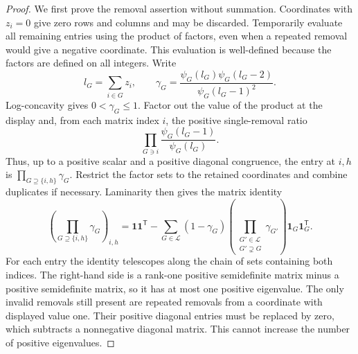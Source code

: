 \begin{proof}
We first prove the removal assertion without summation.
Coordinates with \(z_i=0\) give zero rows and columns and may be
discarded.
Temporarily evaluate all remaining entries using the product of
factors, even when a repeated removal would give a negative coordinate.
This evaluation is well-defined because the factors are defined on
all integers.
Write
\[
 l_G=\sum_{i\in G}z_i,
 \qquad
 \gamma_G=
 \frac{\psi_G(l_G)\psi_G(l_G-2)}
      {\psi_G(l_G-1)^2}.
\]
Log-concavity gives \(0<\gamma_G\le1\).
Factor out the value of the product at the display and, from each
matrix index \(i\), the positive single-removal ratio
\[
 \prod_{G\ni i}\frac{\psi_G(l_G-1)}{\psi_G(l_G)}.
\]
Thus, up to a positive scalar and a positive diagonal congruence,
the entry at \(i,h\) is
\(\prod_{G\supseteq\{i,h\}}\gamma_G\).
Restrict the factor sets to the retained coordinates and combine
duplicates if necessary.  Laminarity then gives the matrix identity
\begin{equation}
 \left(\prod_{G\supseteq\{i,h\}}\gamma_G\right)_{i,h}
 =
 \mathbf 1\mathbf 1^{\mathsf T}
 -
 \sum_{G\in\mathcal L}
 (1-\gamma_G)
 \left(\prod_{\substack{G'\in\mathcal L\\G'\supsetneq G}}
              \gamma_{G'}\right)
 \mathbf 1_G\mathbf 1_G^{\mathsf T}.
 \label{eq:laminar-rank-one}
\end{equation}
For each entry the identity telescopes along the chain of sets
containing both indices.
The right-hand side is a rank-one positive semidefinite matrix
minus a positive semidefinite matrix, so it has at most one positive
eigenvalue.
The only invalid removals still present are repeated removals from a
coordinate with displayed value one.
Their positive diagonal entries must be replaced by zero, which
subtracts a nonnegative diagonal matrix.
This cannot increase the number of positive eigenvalues.


\end{proof}
